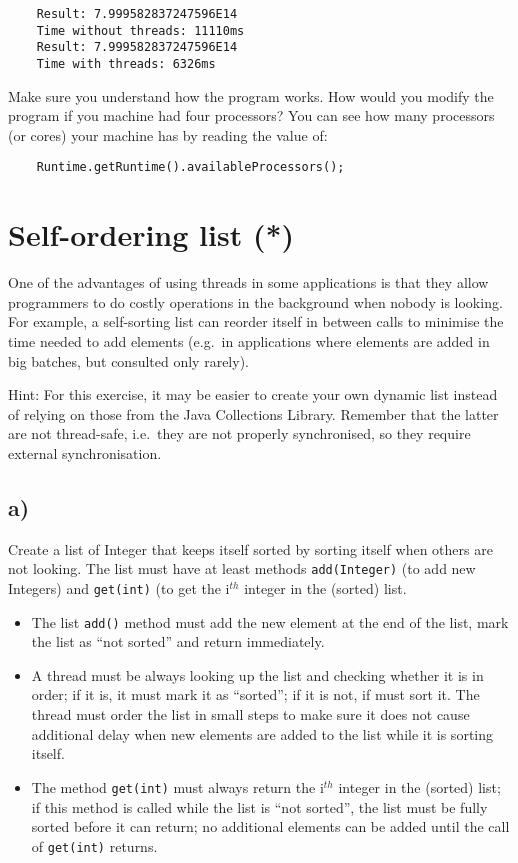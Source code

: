 \documentclass{article}
\begin{document}
\begin{verbatim}
    Result: 7.999582837247596E14
    Time without threads: 11110ms
    Result: 7.999582837247596E14
    Time with threads: 6326ms
\end{verbatim}

Make sure you understand how the program works. How would you modify
the program if you machine had four processors? You can see how many
processors (or cores) your machine has by reading the value of: 

\begin{verbatim}
    Runtime.getRuntime().availableProcessors();
\end{verbatim}


\section{Self-ordering list (*)}
\label{sec:self-ordering-list}

One of the advantages of using threads in some applications is that
they allow programmers to do costly operations in the background when
nobody is looking. For example, a self-sorting list can reorder itself
in between calls to minimise the time needed to add elements (e.g.~in
applications where elements are added in big batches, but consulted
only rarely).

Hint: For this exercise, it may be easier to create your own dynamic
list instead of relying on those from the Java Collections
Library. Remember that the latter are not thread-safe, i.e.~they are
not properly synchronised, so they require external synchronisation. 

\subsection{a)}

Create a list of Integer that keeps itself sorted by sorting itself
when others are not looking. The list must have at least methods
\verb+add(Integer)+ (to add new Integers) and \verb+get(int)+ (to get
the i$^{th}$ integer in the (sorted) list. 

\begin{itemize}
\item The list \verb+add()+ method must add the new element at the end
  of the list, mark the list as ``not sorted'' and return immediately.
\item A thread must be always looking up the list and checking whether
  it is in order; if it is, it must mark it as ``sorted''; if it is
  not, if must sort it. The thread must order the list in small steps
  to make sure it does not cause additional delay when new elements
  are added to the list while it is sorting itself.
\item The method \verb+get(int)+ must always return the i$^{th}$
  integer in the (sorted) list; if this method is called while the
  list is ``not sorted'', the list must be fully sorted before it can
  return; no additional elements can be added until the call of
  \verb+get(int)+ returns.
\end{itemize}
\end{document}
